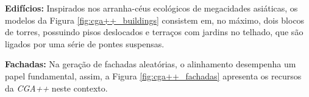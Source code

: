 \newpage

\textbf{Edifícios:} Inspirados nos arranha-céus ecológicos de megacidades asiáticas, os modelos da Figura \ref{fig:cga++_buildings} consistem em, no máximo, dois blocos de torres, possuindo pisos deslocados e terraços com jardins no telhado, que são ligados por uma série de pontes suspensas.

\begin{figure}[h!]
	\centering
	\captionsetup{width=15cm}
	{}
\end{figure}

\newpage

\textbf{Fachadas:} Na geração de fachadas aleatórias, o alinhamento desempenha um papel fundamental, assim, a Figura \ref{fig:cga++_fachadas} apresenta os recursos da \textit{CGA++} neste contexto.

